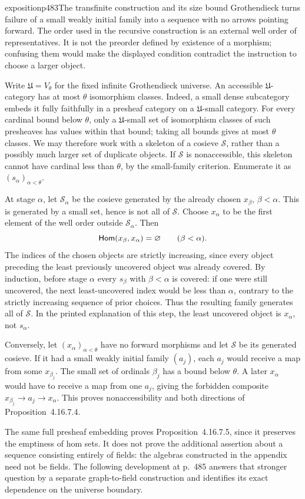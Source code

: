 \begin{dcomment}{exposition}{p483}{The transfinite construction and its size bound}
Grothendieck turns failure of a small weakly initial family into a sequence with no arrows pointing forward. The order used in the recursive construction is an external well order of representatives. It is not the preorder defined by existence of a morphism; confusing them would make the displayed condition contradict the instruction to choose a larger object.

Write $\mathfrak U=V_\theta$ for the fixed infinite Grothendieck universe. An accessible $\mathfrak U$-category has at most $\theta$ isomorphism classes. Indeed, a small dense subcategory embeds it fully faithfully in a presheaf category on a $\mathfrak U$-small category. For every cardinal bound below $\theta$, only a $\mathfrak U$-small set of isomorphism classes of such presheaves has values within that bound; taking all bounds gives at most $\theta$ classes. We may therefore work with a skeleton of a cosieve $\mathcal S$, rather than a possibly much larger set of duplicate objects. If $\mathcal S$ is nonaccessible, this skeleton cannot have cardinal less than $\theta$, by the small-family criterion. Enumerate it as $(s_\alpha)_{\alpha<\theta}$.

At stage $\alpha$, let $\mathcal S_\alpha$ be the cosieve generated by the already chosen $x_\beta$, $\beta<\alpha$. This is generated by a small set, hence is not all of $\mathcal S$. Choose $x_\alpha$ to be the first element of the well order outside $\mathcal S_\alpha$. Then
\[
 \mathsf{Hom}(x_\beta,x_\alpha)=\varnothing\qquad(\beta<\alpha).
\]
The indices of the chosen objects are strictly increasing, since every object preceding the least previously uncovered object was already covered. By induction, before stage $\alpha$ every $s_\beta$ with $\beta<\alpha$ is covered: if one were still uncovered, the next least-uncovered index would be less than $\alpha$, contrary to the strictly increasing sequence of prior choices. Thus the resulting family generates all of $\mathcal S$. In the printed explanation of this step, the least uncovered object is $x_\alpha$, not $s_\alpha$.

Conversely, let $(x_\alpha)_{\alpha<\theta}$ have no forward morphisms and let $\mathcal S$ be its generated cosieve. If it had a small weakly initial family $(a_j)$, each $a_j$ would receive a map from some $x_{\beta_j}$. The small set of ordinals $\beta_j$ has a bound below $\theta$. A later $x_\alpha$ would have to receive a map from one $a_j$, giving the forbidden composite $x_{\beta_j}\to a_j\to x_\alpha$. This proves nonaccessibility and both directions of Proposition~4.16.7.4.

The same full presheaf embedding proves Proposition~4.16.7.5, since it preserves the emptiness of hom sets. It does not prove the additional assertion about a sequence consisting entirely of fields: the algebras constructed in the appendix need not be fields. The following development at p.~485 answers that stronger question by a separate graph-to-field construction and identifies its exact dependence on the universe boundary.
\end{dcomment}


